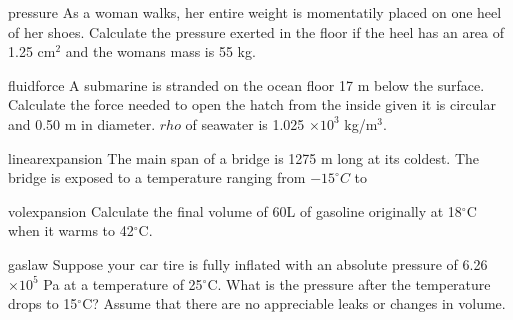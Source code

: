 \documentclass[letterpaper]{article}
\begin{document}
{ 
\begin{question}{pressure}
  As a woman walks, her entire weight is momentatily placed on one heel of her shoes. Calculate the pressure exerted in the floor if the heel has an area of 1.25 cm$^2$ and the womans mass is 55 kg.
\begin{choices}
\correctchoice{ }%
\wrongchoice{  }%
\wrongchoice{  }%
\wrongchoice{  }%
\wrongchoice{  }%
\end{choices}
\end{question}

\begin{question}{fluidforce}
A submarine is stranded on the ocean floor 17 m below the surface. Calculate the force needed to open the hatch from the inside given it is circular and 0.50 m in diameter. $rho$ of seawater is 1.025 $\times 10^3$ kg/m$^3$.
\begin{choices}
\correctchoice{ }%
\wrongchoice{ }%
\wrongchoice{ }%
\wrongchoice{ }%
\wrongchoice{ }%
\end{choices}
\end{question}

\begin{question}{linearexpansion}
The main span of a bridge is 1275 m long at its coldest. The bridge is exposed to a temperature ranging from $-15 ^\circ C$ to 
\begin{choices}
\correctchoice{ }%
\wrongchoice{ }%
\wrongchoice{ }%
\wrongchoice{ }%
\wrongchoice{ }%
\end{choices}
\end{question}



\begin{question}{volexpansion}
Calculate the final volume of 60L of gasoline originally at 18$^\circ$C when it warms to 42$^\circ$C.
\begin{choices}
\correctchoice{ }%
\wrongchoice{ }%
\wrongchoice{ }%
\wrongchoice{ }%
\wrongchoice{ }%
\end{choices}
\end{question}

\begin{question}{gaslaw}
Suppose your car tire is fully inflated with an absolute pressure of 6.26 $\times 10^5$ Pa at a temperature of 25$^\circ$C. What is the pressure after the temperature drops to 15$^\circ$C? Assume that there are no appreciable leaks or changes in volume.
\begin{choices}
\correctchoice{ }%
\wrongchoice{ }%
\wrongchoice{ }%
\wrongchoice{ }%
\wrongchoice{ }%
\end{choices}
\end{question}

}
\end{document}
